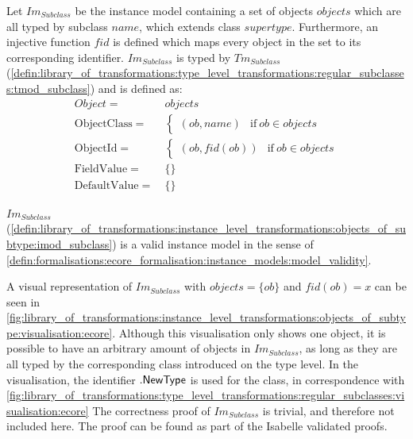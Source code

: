 \begin{defin}
\label{defin:library_of_transformations:instance_level_transformations:objects_of_subtype:imod_subclass}
Let $Im_{Subclass}$ be the instance model containing a set of objects $objects$ which are all typed by subclass $name$, which extends class $supertype$. Furthermore, an injective function $fid$ is defined which maps every object in the set to its corresponding identifier. $Im_{Subclass}$ is typed by $Tm_{Subclass}$ (\cref{defin:library_of_transformations:type_level_transformations:regular_subclasses:tmod_subclass}) and is defined as:
\begin{align*}
Object =\ &objects \\
\mathrm{ObjectClass} =\ & \begin{cases}
    (ob, name) & \mathrm{if }\ ob \in objects
\end{cases}\\
\mathrm{ObjectId} =\ & \begin{cases}
    (ob, fid(ob)) & \mathrm{if }\ ob \in objects
\end{cases}\\
\mathrm{FieldValue} =\ & \{\} \\
\mathrm{DefaultValue} =\ & \{\}
\end{align*}
\end{defin}

\begin{thm}
\label{defin:library_of_transformations:instance_level_transformations:objects_of_subtype:imod_subclass_correct}
$Im_{Subclass}$ (\cref{defin:library_of_transformations:instance_level_transformations:objects_of_subtype:imod_subclass}) is a valid instance model in the sense of \cref{defin:formalisations:ecore_formalisation:instance_models:model_validity}.
\end{thm}

A visual representation of $Im_{Subclass}$ with $objects = \{ob\}$ and $fid(ob) = x$ can be seen in \cref{fig:library_of_transformations:instance_level_transformations:objects_of_subtype:visualisation:ecore}. Although this visualisation only shows one object, it is possible to have an arbitrary amount of objects in $Im_{Subclass}$, as long as they are all typed by the corresponding class introduced on the type level. In the visualisation, the identifier $.\mathsf{NewType}$ is used for the class, in correspondence with \cref{fig:library_of_transformations:type_level_transformations:regular_subclasses:visualisation:ecore} The correctness proof of $Im_{Subclass}$ is trivial, and therefore not included here. The proof can be found as part of the Isabelle validated proofs.

